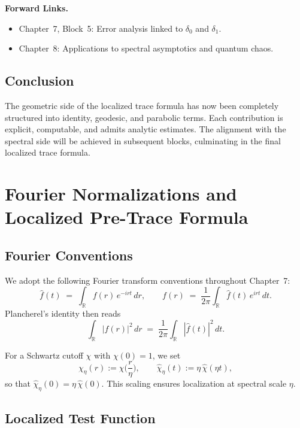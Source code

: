 \noindent\textbf{Forward Links.}
\begin{itemize}
  \item Chapter~7, Block~5: Error analysis linked to $\delta_0$ and $\delta_1$.
  \item Chapter~8: Applications to spectral asymptotics and quantum chaos.
\end{itemize}

\subsection{Conclusion}

The geometric side of the localized trace formula has now been completely structured into identity, geodesic, and parabolic terms.  
Each contribution is explicit, computable, and admits analytic estimates.  
The alignment with the spectral side will be achieved in subsequent blocks, culminating in the final localized trace formula.


\section{Fourier Normalizations and Localized Pre-Trace Formula}

\subsection{Fourier Conventions}

We adopt the following Fourier transform conventions throughout Chapter~7:
\[
  \widehat{f}(t) \;=\; \int_{\mathbb{R}} f(r)\, e^{-i r t}\, dr,
  \qquad
  f(r) \;=\; \frac{1}{2\pi}\int_{\mathbb{R}} \widehat{f}(t)\, e^{i r t}\, dt.
\]
Plancherel's identity then reads
\[
  \int_{\mathbb{R}} |f(r)|^2\, dr
  \;=\; \frac{1}{2\pi}\int_{\mathbb{R}} |\widehat{f}(t)|^2\, dt.
\]

For a Schwartz cutoff $\chi$ with $\chi(0)=1$, we set
\[
  \chi_\eta(r) := \chi\!\Big(\frac{r}{\eta}\Big), \qquad
  \widehat{\chi}_\eta(t) := \eta\, \widehat{\chi}(\eta t),
\]
so that $\widehat{\chi}_\eta(0)=\eta\,\widehat{\chi}(0)$.
This scaling ensures localization at spectral scale $\eta$.

\subsection{Localized Test Function}

